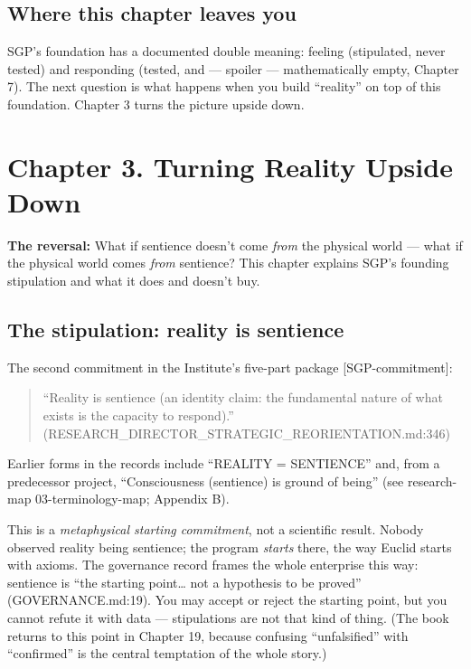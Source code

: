 \documentclass[
  11pt,
]{book}
\begin{document}
\section{Where this chapter leaves
you}\label{where-this-chapter-leaves-you-1}

SGP's foundation has a documented double meaning: feeling (stipulated,
never tested) and responding (tested, and --- spoiler --- mathematically
empty, Chapter 7). The next question is what happens when you build
``reality'' on top of this foundation. Chapter 3 turns the picture
upside down.

\newpage

\chapter{Chapter 3. Turning Reality Upside
Down}\label{chapter-3.-turning-reality-upside-down}

\textbf{The reversal:} What if sentience doesn't come \emph{from} the
physical world --- what if the physical world comes \emph{from}
sentience? This chapter explains SGP's founding stipulation and what it
does and doesn't buy.

\section{The stipulation: reality is
sentience}\label{the-stipulation-reality-is-sentience}

The second commitment in the Institute's five-part package
{[}SGP-commitment{]}:

\begin{quote}
``Reality is sentience (an identity claim: the fundamental nature of
what exists is the capacity to respond).''
(RESEARCH\_DIRECTOR\_STRATEGIC\_REORIENTATION.md:346)
\end{quote}

Earlier forms in the records include ``REALITY = SENTIENCE'' and, from a
predecessor project, ``Consciousness (sentience) is ground of being''
(see research-map 03-terminology-map; Appendix B).

This is a \emph{metaphysical starting commitment}, not a scientific
result. Nobody observed reality being sentience; the program
\emph{starts} there, the way Euclid starts with axioms. The governance
record frames the whole enterprise this way: sentience is ``the starting
point\ldots{} not a hypothesis to be proved'' (GOVERNANCE.md:19). You
may accept or reject the starting point, but you cannot refute it with
data --- stipulations are not that kind of thing. (The book returns to
this point in Chapter 19, because confusing ``unfalsified'' with
``confirmed'' is the central temptation of the whole story.)
\end{document}
